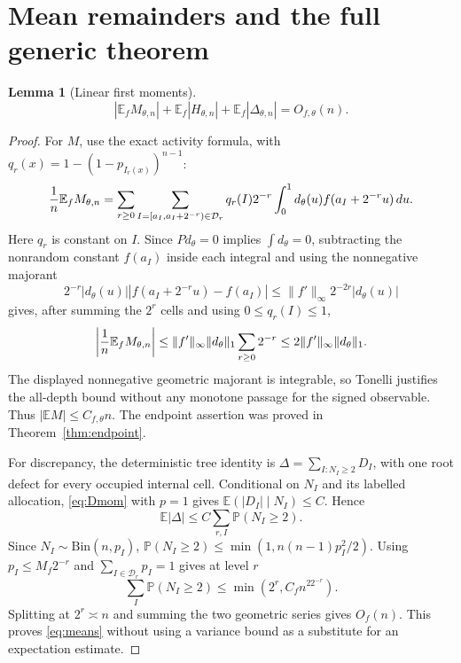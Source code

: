 \documentclass[11pt]{article}
\numberwithin{equation}{section}
\newtheorem{lemma}[theorem]{Lemma}
\newcommand{\E}{\mathbb E}\newcommand{\Pp}{\mathbb P}
\newcommand{\1}{\mathbf 1}\newcommand{\F}{\mathcal F}\newcommand{\D}{\mathcal D}
\newcommand{\norm}[1]{\lVert#1\rVert}
\begin{document}
\section{Mean remainders and the full generic theorem}
\begin{lemma}[Linear first moments]\label{lem:means}
\begin{equation}\label{eq:means}
 |\E_fM_{\theta,n}|+\E_f|H_{\theta,n}|+\E_f|\Delta_{\theta,n}|
 =O_{f,\theta}(n).
\end{equation}
\end{lemma}
\begin{proof}
For $M$, use the exact activity formula, with
$q_r(x)=1-(1-p_{I_r(x)})^{n-1}$:
\[
 {1\over n}\E_fM_{\theta,n}
 =\sum_{r\ge0}\sum_{I=[a_I,a_I+2^{-r})\in\D_r}
 q_r(I)2^{-r}\int_0^1d_\theta(u)f(a_I+2^{-r}u)\,du.
\]
Here $q_r$ is constant on $I$.  Since $Pd_\theta=0$ implies
$\int d_\theta=0$, subtracting the nonrandom constant $f(a_I)$ inside
each integral and using the nonnegative majorant
\[
 2^{-r}|d_\theta(u)|
 |f(a_I+2^{-r}u)-f(a_I)|
 \le \norm{f'}_\infty 2^{-2r}|d_\theta(u)|
\]
gives, after summing the $2^r$ cells and using $0\le q_r(I)\le1$,
\[
 \left|{1\over n}\E_fM_{\theta,n}\right|
 \le \norm{f'}_\infty\norm{d_\theta}_1\sum_{r\ge0}2^{-r}
 \le2\norm{f'}_\infty\norm{d_\theta}_1.
\]
The displayed nonnegative geometric majorant is integrable, so Tonelli
justifies the all-depth bound without any monotone passage for the signed
observable.  Thus $|\E M|\le C_{f,\theta}n$.  The endpoint assertion was proved in
Theorem~\ref{thm:endpoint}.

For discrepancy, the deterministic tree identity is
$\Delta=\sum_{I:N_I\ge2}D_I$, with one root defect for every occupied
internal cell.  Conditional on $N_I$ and its labelled allocation,
\eqref{eq:Dmom} with $p=1$ gives $\E(|D_I|\mid N_I)\le C$.  Hence
\[
 \E|\Delta|\le C\sum_{r,I}\Pp(N_I\ge2).
\]
Since $N_I\sim\mathrm{Bin}(n,p_I)$,
$\Pp(N_I\ge2)\le\min(1,n(n-1)p_I^2/2)$.  Using
$p_I\le M_f2^{-r}$ and $\sum_{I\in\D_r}p_I=1$ gives at level $r$
\[
 \sum_I\Pp(N_I\ge2)\le\min(2^r,C_fn^22^{-r}).
\]
Splitting at $2^r\asymp n$ and summing the two geometric series gives
$O_f(n)$.  This proves \eqref{eq:means} without using a variance bound as a
substitute for an expectation estimate.
\end{proof}
\end{document}
